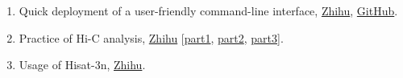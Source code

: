 \begin{enumerate}
    \item Quick deployment of a user-friendly command-line interface,
    \href{https://zhuanlan.zhihu.com/p/648520368}{Zhihu},
    \href{https://github.com/hermanzhaozzzz/.my_shell_envs}{GitHub}.
    \item Practice of Hi-C analysis,
    \href{https://zhuanlan.zhihu.com/p/542713896}{Zhihu} [\href{https://zhuanlan.zhihu.com/p/542713896}{part1}, 
    \href{https://zhuanlan.zhihu.com/p/543987644}{part2},
    \href{https://zhuanlan.zhihu.com/p/545657147}{part3}].
    \item Usage of Hisat-3n,
    \href{https://zhuanlan.zhihu.com/p/386371449}{Zhihu}.
\end{enumerate}